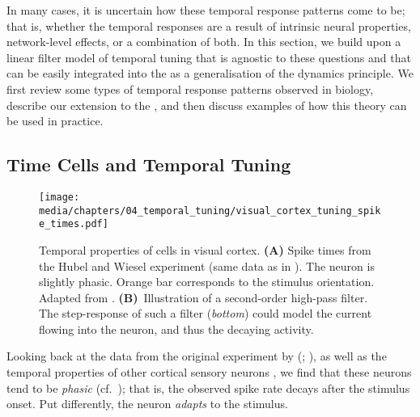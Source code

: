 In many cases, it is uncertain how these temporal response patterns come to be; that is, whether the temporal responses are a result of intrinsic neural properties, network-level effects, or a combination of both.
In this section, we build upon a linear filter model of temporal tuning \citep{watson1983look,adelson1985spatiotemporal} that is agnostic to these questions and that can be easily integrated into the \NEF as a generalisation of the dynamics principle.
We first review some types of temporal response patterns observed in biology, describe our extension to the \NEF, and then discuss examples of how this theory can be used in practice.

\subsection{Time Cells and Temporal Tuning}
\label{sec:temporal_tuning_biology}

\begin{figure}
	\centering
	\texttt{[image: media/chapters/04\_temporal\_tuning/visual\_cortex\_tuning\_spike\_times.pdf]}%
	{\label{fig:visual_cortex_tuning_spike_times_a}}%
	{\label{fig:visual_cortex_tuning_spike_times_b}}%
	\caption[Temporal properties of cells in visual cortex]{
		Temporal properties of cells in visual cortex.
		\textbf{(A)} Spike times from the Hubel and Wiesel experiment (same data as in ).
		The neuron is slightly phasic.
		Orange bar corresponds to the stimulus orientation.
		Adapted from \citet[Figure~3]{hubel1959receptive}.
		\textbf{(B)}~Illustration of a second-order high-pass filter. The step-response of such a filter (\emph{bottom}) could model the current flowing into the neuron, and thus the decaying activity.
	}
	\label{fig:visual_cortex_tuning_spike_times}
\end{figure}

Looking back at the data from the original experiment by \citeauthor{hubel1959receptive} (\citeyear{hubel1959receptive}; ), as well as the temporal properties of other cortical sensory neurons \citep[cf.][Part~V]{kandel2012principles}, we find that these neurons tend to be \emph{phasic} (cf.~); that is, the observed spike rate decays after the stimulus onset.
Put differently, the neuron \emph{adapts} to the stimulus.

